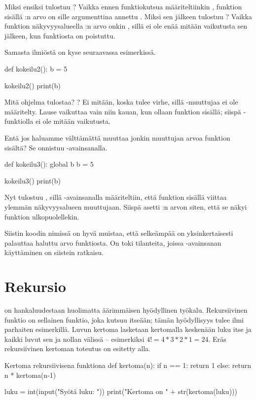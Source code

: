 Miksi ensiksi tulostuu ? Vaikka ennen funktiokutsua määriteltiinkin , funktion sisällä :n arvo on sille argumenttina annettu . Miksi sen jälkeen tulostuu ? Vaikka funktion näkyvyysalueella :n arvo onkin , sillä ei ole enää mitään vaikutusta sen jälkeen, kun funktiosta on poistuttu.

Samasta ilmiöstä on kyse seuraavassa esimerkissä.

\begin{python}
def kokeilu2():
        b = 5

kokeilu2()
print(b)
\end{python}

Mitä ohjelma tulostaa? ? Ei mitään, koska tulee virhe, sillä -muuttujaa ei ole määritelty. Lause  vaikuttaa vain niin kauan, kun ollaan funktion sisällä; siispä -funktiolla ei ole mitään vaikutusta.

Entä jos haluamme välttämättä muuttaa jonkin muuttujan arvoa funktion sisältä? Se onnistuu -avainsanalla.

\begin{python}
def kokeilu3():
        global b
        b = 5

kokeilu3()
print(b)
\end{python}

Nyt tulostuu , sillä -avainsanalla määriteltiin, että  funktion sisällä viittaa ylemmän näkyvyysalueen muuttujaan. Siispä  asetti :n arvon siten, että se näkyi funktion ulkopuolellekin.

Siistin koodin nimissä on hyvä muistaa, että selkeämpää on yksinkertaisesti palauttaa haluttu arvo funktiosta. On toki tilanteita, joissa -avainsanan käyttäminen on siistein ratkaisu.

\section{Rekursio}

 on hankaluudestaan huolimatta äärimmäisen hyödyllinen työkalu. Rekursiivinen funktio on sellainen funktio, joka kutsuu itseään; tämän hyödyllisyys tulee ilmi parhaiten esimerkillä. Luvun kertoma lasketaan kertomalla keskenään luku itse ja kaikki luvut sen ja nollan välissä -- esimerkiksi $4! = 4 * 3 * 2 * 1 = 24$. Eräs rekursiivinen kertoman toteutus on esitetty alla.

\begin{example}{Kertoma rekursiivisena funktiona}
def kertoma(n):
        if n == 1:
                return 1
        else:
                return n * kertoma(n-1)

luku = int(input("Syötä luku: "))
print("Kertoma on " + str(kertoma(luku)))
\end{example}

